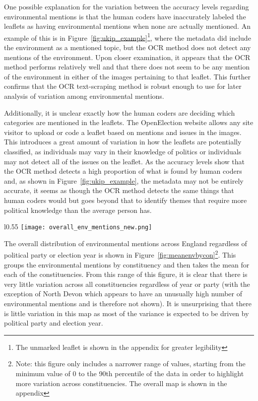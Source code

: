 \documentclass[12pt,letterpaper]{article}
\begin{document}


One possible explanation for the variation between the accuracy levels regarding environmental mentions is that the human coders have inaccurately labeled the leaflets as having environmental mentions when none are actually mentioned. An example of this is in Figure~\ref{fig:ukip_example}\footnote{The unmarked leaflet is shown in the appendix for greater legibility}, where the metadata did include the environment as a mentioned topic, but the OCR method does not detect any mentions of the environment. Upon closer examination, it appears that the OCR method performs relatively well and that there does not seem to be any mention of the environment in either of the images pertaining to that leaflet. This further confirms that the OCR text-scraping method is robust enough to use for later analysis of variation among environmental mentions. 


Additionally, it is unclear exactly how the human coders are deciding which categories are mentioned in the leaflets. The OpenElection website allows any site visitor to upload or code a leaflet based on mentions and issues in the images. This introduces a great amount of variation in how the leaflets are potentially classified, as individuals may vary in their knowledge of politics or individuals may not detect all of the issues on the leaflet. As the accuracy levels show that the OCR method detects a high proportion of what is found by human coders and, as shown in Figure~\ref{fig:ukip_example}, the metadata may not be entirely accurate, it seems as though the OCR method detects the same things that human coders would but goes beyond that to identify themes that require more political knowledge than the average person has.



\begin{wrapfigure}[23]{l}{0.55\textwidth}
	\centering
	\texttt{[image: overall\_env\_mentions\_new.png]}
	\caption{Mean Environmental Mentions By Constituency}
	\label{fig:meanenvbycon}
\end{wrapfigure}




The overall distribution of environmental mentions across England regardless of political party or election year is shown in Figure~\ref{fig:meanenvbycon}\footnote{Note: this figure only includes a narrower range of values, starting from the minimum value of 0 to the 90th percentile of the data in order to highlight more variation across constituencies. The overall map is shown in the appendix}. This groups the environmental mentions by constituency and then takes the mean for each of the constituencies. From this range of this figure, it is clear that there is very little variation across all constituencies regardless of year or party (with the exception of North Devon which appears to have an unusually high number of environmental mentions and is therefore not shown). It is unsurprising that there is little variation in this map as most of the variance is expected to be driven by political party and election year. 
\end{document}
